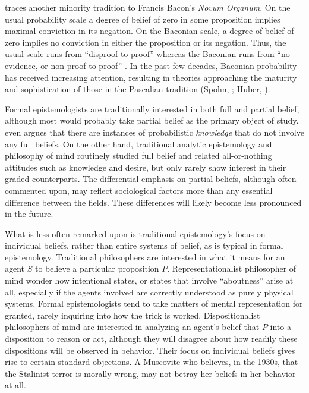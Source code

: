 \citet{cohen1980some} traces another minority tradition to Francis Bacon's {\em
Novum Organum}. On the usual probability scale a degree of belief of zero in
some proposition implies maximal conviction in its negation. On the Baconian
scale, a degree of belief of zero implies no conviction in either the
proposition or its negation. Thus, the usual scale runs from ``disproof to
proof'' whereas the Baconian runs from ``no evidence, or non-proof to proof''
\citep[p. 224]{cohen1980some}.  In the past few decades, Baconian probability
has received increasing attention, resulting in theories approaching the
maturity and sophistication of those in the Pascalian tradition
(Spohn, ; Huber, ).

Formal epistemologists are traditionally interested in both full and partial
belief, although most would probably take partial belief as the primary object
of study. \citet{moss2018probabilistic} even argues that there are instances of
probabilistic {\em knowledge} that do not involve any full beliefs.  On the
other hand, traditional analytic epistemology and philosophy of mind routinely
studied full belief and related all-or-nothing attitudes such as knowledge and
desire, but only rarely show interest in their graded counterparts. The
differential emphasis on partial beliefs, although often commented upon, may
reflect sociological factors more than any essential difference between the
fields. These differences will likely become less pronounced in the future.

What is less often remarked upon is traditional epistemology's focus on
individual beliefs, rather than entire systems of belief, as is typical in
formal epistemology. Traditional philosophers are interested in what it means
for an agent $S$ to believe a particular proposition $P$. Representationalist
philosopher of mind wonder how intentional states, or states that involve
``aboutness'' arise at all, especially if the agents involved are correctly
understood as purely physical systems. Formal epistemologists tend to take
matters of mental representation for granted, rarely inquiring into how the
trick is worked.  Dispositionalist philosophers of mind are interested in
analyzing an agent's belief that $P$ into a disposition to reason or act,
although they will disagree about how readily these dispositions will be
observed in behavior. Their focus on individual beliefs gives rise to certain
standard objections. A Muscovite who believes, in the 1930s, that the Stalinist
terror is morally wrong, may not betray her beliefs in her behavior at all.

